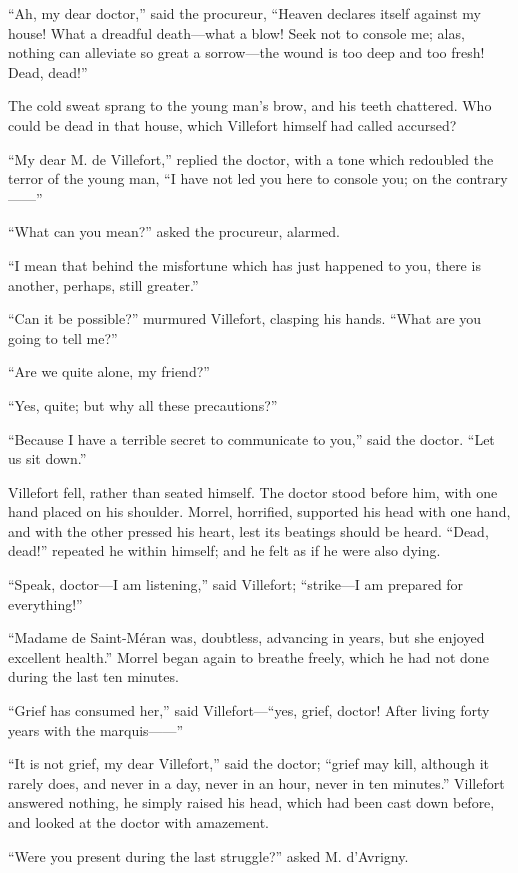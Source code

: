 “Ah, my dear doctor,” said the procureur, “Heaven declares itself
against my house! What a dreadful death—what a blow! Seek not to
console me; alas, nothing can alleviate so great a sorrow—the wound is
too deep and too fresh! Dead, dead!”

The cold sweat sprang to the young man’s brow, and his teeth chattered.
Who could be dead in that house, which Villefort himself had called
accursed?

“My dear M. de Villefort,” replied the doctor, with a tone which
redoubled the terror of the young man, “I have not led you here to
console you; on the contrary——”

“What can you mean?” asked the procureur, alarmed.

“I mean that behind the misfortune which has just happened to you,
there is another, perhaps, still greater.”

“Can it be possible?” murmured Villefort, clasping his hands. “What are
you going to tell me?”

“Are we quite alone, my friend?”

“Yes, quite; but why all these precautions?”

“Because I have a terrible secret to communicate to you,” said the
doctor. “Let us sit down.”

Villefort fell, rather than seated himself. The doctor stood before
him, with one hand placed on his shoulder. Morrel, horrified, supported
his head with one hand, and with the other pressed his heart, lest its
beatings should be heard. “Dead, dead!” repeated he within himself; and
he felt as if he were also dying.

“Speak, doctor—I am listening,” said Villefort; “strike—I am prepared
for everything!”

“Madame de Saint-Méran was, doubtless, advancing in years, but she
enjoyed excellent health.” Morrel began again to breathe freely, which
he had not done during the last ten minutes.

“Grief has consumed her,” said Villefort—“yes, grief, doctor! After
living forty years with the marquis——”

“It is not grief, my dear Villefort,” said the doctor; “grief may kill,
although it rarely does, and never in a day, never in an hour, never in
ten minutes.” Villefort answered nothing, he simply raised his head,
which had been cast down before, and looked at the doctor with
amazement.

“Were you present during the last struggle?” asked M. d’Avrigny.

